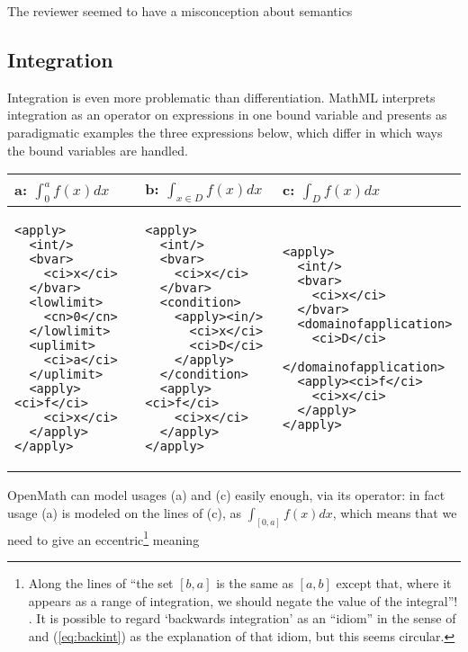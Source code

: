 \documentclass{llncs}
\begin{document}
\begin{newpart}{The reviewer seemed to have a misconception about semantics}
\iffull\subsection{Integration}\fi

Integration is even more problematic than differentiation. MathML interprets integration
as an operator on expressions in one bound variable and presents as paradigmatic examples
the three expressions below, which differ in which ways the bound variables are handled.
\begin{center}
\lstset{frame=none,numbers=none,lineskip=-.7ex,aboveskip=-.5em,belowskip=-1em,language=MathML2}
\begin{tabular}{|p{3.3cm}|p{3.5cm}|p{3.8cm}|}\hline
  a: $\int_0^af(x) dx$ & b: $\int_{x\in D}f(x) dx$ & c: $\int_Df(x)dx$\\\hline
\begin{lstlisting}
<apply>
  <int/>
  <bvar>
    <ci>x</ci>
  </bvar>
  <lowlimit>
    <cn>0</cn>
  </lowlimit>
  <uplimit>
    <ci>a</ci>
  </uplimit>
  <apply><ci>f</ci>
    <ci>x</ci>
  </apply>
</apply>
\end{lstlisting}
&
\begin{lstlisting}[language=MathML2]
<apply>
  <int/>
  <bvar>
    <ci>x</ci>
  </bvar>
  <condition>
    <apply><in/>
      <ci>x</ci>
      <ci>D</ci>
    </apply>
  </condition>
  <apply><ci>f</ci>
    <ci>x</ci>
  </apply>
</apply>
\end{lstlisting}
&
\begin{lstlisting}[language=MathML2]
<apply>
  <int/>
  <bvar>
    <ci>x</ci>
  </bvar>
  <domainofapplication>
    <ci>D</ci>
  </domainofapplication>
  <apply><ci>f</ci>
    <ci>x</ci>
  </apply>
</apply>
\end{lstlisting}
\\\hline
\end{tabular}
\end{center}
OpenMath can model usages (a) and (c) easily enough, via its {} operator:
in fact usage (a) is modeled on the lines of (c), as $\int_{[0,a]}f(x) dx$, which means
that we need to give an eccentric\footnote{Along the lines of ``the set $[b,a]$ is the
  same as $[a,b]$ except that, where it appears as a range of integration, we should
  negate the value of the integral''! \cite{Kohlhase2008}. It is possible to regard
  `backwards integration' as an ``idiom'' in the sense of \cite{LuoCallaghan1999} and
  (\ref{eq:backint}) as the explanation of that idiom, but this seems circular.} meaning

\end{newpart}
\end{document}
